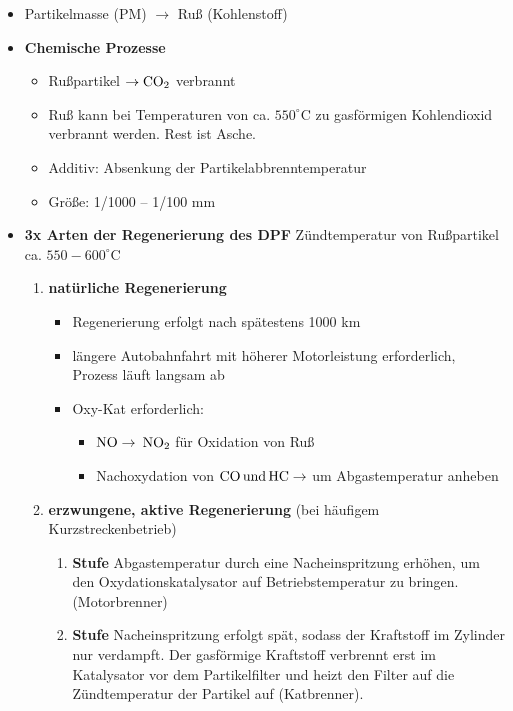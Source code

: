 \begin{itemize}
\item
  Partikelmasse (PM) $\to$ Ruß (Kohlenstoff)
\item
  \textbf{Chemische Prozesse}

  \begin{itemize}
  \item
    Rußpartikel $\to \ce{CO2}$ verbrannt
  \item
    Ruß kann bei Temperaturen von ca. $550^\circ \text{C}$ zu
    gasförmigen Kohlendioxid verbrannt werden. Rest ist Asche.
  \item
    Additiv: Absenkung der Partikelabbrenntemperatur
  \item
    Größe: 1/1000 -- 1/100 mm
  \end{itemize}
\item
  \textbf{3x Arten der Regenerierung des DPF} Zündtemperatur von
  Rußpartikel ca. $550 - 600^\circ\text{C}$

  \begin{enumerate}
  \item
    \textbf{natürliche Regenerierung}

    \begin{itemize}
    \item
      Regenerierung erfolgt nach spätestens 1000 km
    \item
      längere Autobahnfahrt mit höherer Motorleistung erforderlich,
      Prozess läuft langsam ab
    \item
      Oxy-Kat erforderlich:

      \begin{itemize}
      \item
        $\ce{NO} \to$ $\ce{NO2}$ für Oxidation von Ruß
      \item
        Nachoxydation von $\ce{CO und HC} \to$ um Abgastemperatur
        anheben
      \end{itemize}
    \end{itemize}
  \item
    \textbf{erzwungene, aktive Regenerierung} (bei häufigem
    Kurzstreckenbetrieb)

    \begin{enumerate}
    \def\labelenumii{\arabic{enumii}.}
    \item
      \textbf{Stufe} Abgastemperatur durch eine Nacheinspritzung
      erhöhen, um den Oxydationskatalysator auf Betriebstemperatur zu
      bringen. (Motorbrenner)
    \item
      \textbf{Stufe} Nacheinspritzung erfolgt spät, sodass der
      Kraftstoff im Zylinder nur verdampft. Der gasförmige Kraftstoff
      verbrennt erst im Katalysator vor dem Partikelfilter und heizt den
      Filter auf die Zündtemperatur der Partikel auf (Katbrenner).


\end{enumerate}
\end{enumerate}
\end{itemize}
